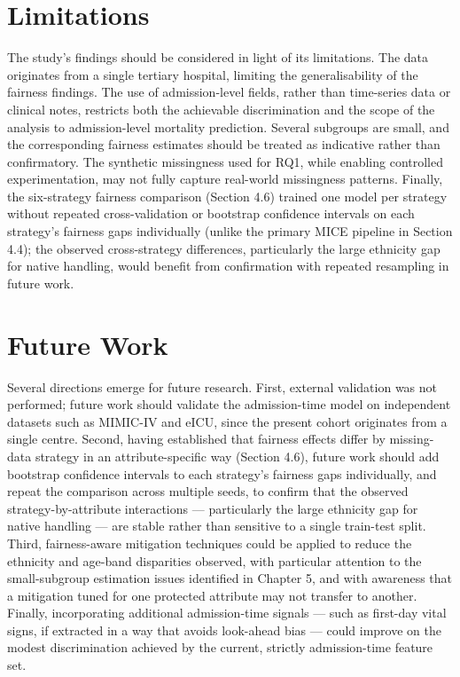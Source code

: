 \documentclass[12pt,a4paper]{report}
\begin{document}
\section{Limitations}
The study's findings should be considered in light of its limitations. The data originates from a single tertiary hospital, limiting the generalisability of the fairness findings. The use of admission-level fields, rather than time-series data or clinical notes, restricts both the achievable discrimination and the scope of the analysis to admission-level mortality prediction. Several subgroups are small, and the corresponding fairness estimates should be treated as indicative rather than confirmatory. The synthetic missingness used for RQ1, while enabling controlled experimentation, may not fully capture real-world missingness patterns. Finally, the six-strategy fairness comparison (Section 4.6) trained one model per strategy without repeated cross-validation or bootstrap confidence intervals on each strategy's fairness gaps individually (unlike the primary MICE pipeline in Section 4.4); the observed cross-strategy differences, particularly the large ethnicity gap for native handling, would benefit from confirmation with repeated resampling in future work.


\section{Future Work}
Several directions emerge for future research. First, external validation was not performed; future work should validate the admission-time model on independent datasets such as MIMIC-IV and eICU, since the present cohort originates from a single centre. Second, having established that fairness effects differ by missing-data strategy in an attribute-specific way (Section 4.6), future work should add bootstrap confidence intervals to each strategy's fairness gaps individually, and repeat the comparison across multiple seeds, to confirm that the observed strategy-by-attribute interactions --- particularly the large ethnicity gap for native handling --- are stable rather than sensitive to a single train-test split. Third, fairness-aware mitigation techniques could be applied to reduce the ethnicity and age-band disparities observed, with particular attention to the small-subgroup estimation issues identified in Chapter 5, and with awareness that a mitigation tuned for one protected attribute may not transfer to another. Finally, incorporating additional admission-time signals --- such as first-day vital signs, if extracted in a way that avoids look-ahead bias --- could improve on the modest discrimination achieved by the current, strictly admission-time feature set.
\end{document}
